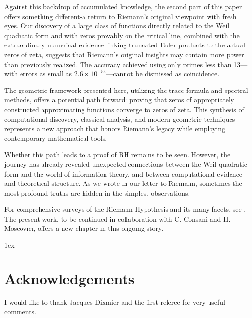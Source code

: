\documentclass{article}
\begin{document}
Against this backdrop of accumulated knowledge, the second part of this paper offers something different-a return to Riemann's original viewpoint with fresh eyes. Our discovery of a large class of functions directly related to the Weil quadratic form and with zeros provably on the critical line, combined with the extraordinary numerical evidence linking truncated Euler products to the actual zeros of zeta, suggests that Riemann's original insights may contain more power than previously realized. The accuracy achieved using only primes less than 13—with errors as small as $2.6 × 10^{-55}$—cannot be dismissed as coincidence.

The geometric framework presented here, utilizing the trace formula and spectral methods, offers a potential path forward: proving that zeros of appropriately constructed approximating functions converge to zeros of zeta. This synthesis of computational discovery, classical analysis, and modern geometric techniques represents a new approach that honors Riemann's legacy while employing contemporary mathematical tools.

Whether this path leads to a proof of RH remains to be seen. However, the journey has already revealed unexpected connections between the Weil quadratic form and the world of information theory, and between computational evidence and theoretical structure. As we wrote in our letter to Riemann, sometimes the most profound truths are hidden in the simplest observations.

For comprehensive surveys of the Riemann Hypothesis and its many facets, see \cite{Patterson,BombieriRH,Edwards,IvicBook,ConreyLindelof,ConreyRH}. The present work, to be continued in collaboration with C. Consani and H. Moscovici, offers a new chapter in this ongoing story.


\begingroup
\parindent 0pt
\parskip 1ex
\theendnotes
\endgroup


\section*{Acknowledgements}
I would like to thank Jacques Dixmier and the first referee for very useful comments. 
\end{document}
